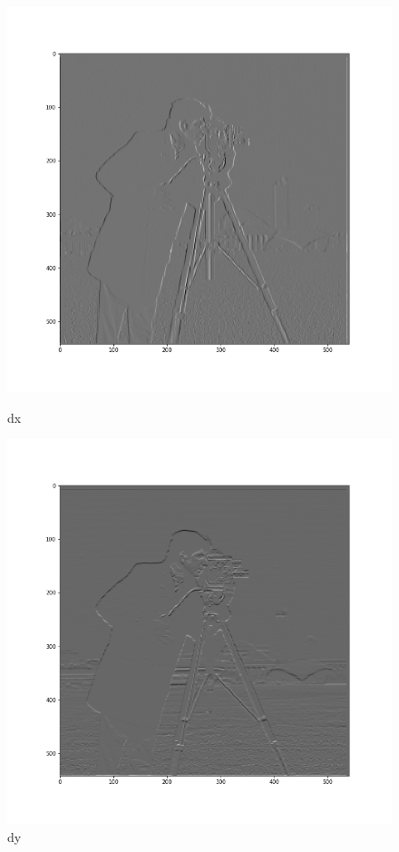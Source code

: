 \documentclass{article}
\begin{document}
\begin{figure}[!htb]
    \includegraphics[width=\linewidth]{dx.png}
    \caption{dx}\label{fig:awesome_image1}
\endminipage
{}
    \includegraphics[width=\linewidth]{dy.png}
    \caption{dy}\label{fig:awesome_image2}
\endminipage


\end{figure}
\end{document}
